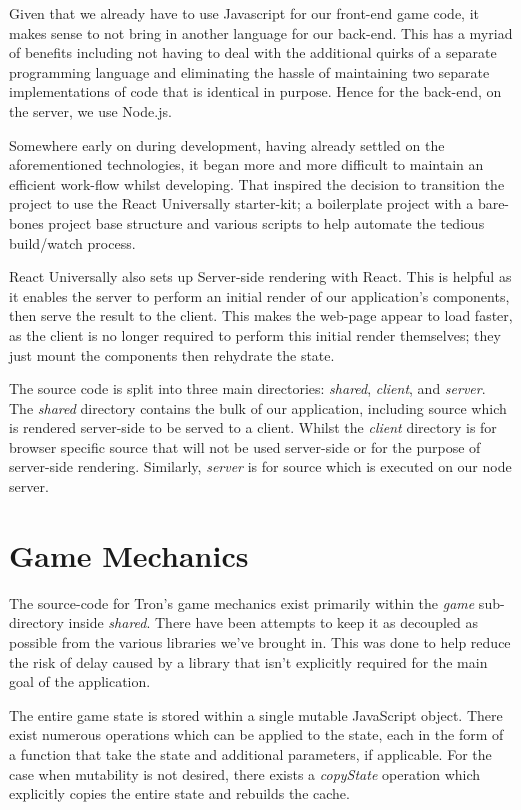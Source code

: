 \documentclass{standalone}
\begin{document}
	Given that we already have to use Javascript for our front-end game code, it makes sense to not bring in another language for our back-end. This has a myriad of benefits including not having to deal with the additional quirks of a separate programming language and eliminating the hassle of maintaining two separate implementations of code that is identical in purpose. Hence for the back-end, on the server, we use Node.js\parencite{NodeJs}.

	Somewhere early on during development, having already settled on the aforementioned technologies, it began more and more difficult to maintain an efficient work-flow whilst developing. That inspired the decision to transition the project to use the React Universally \parencite{ReactUniversally} starter-kit; a boilerplate project with a bare-bones project base structure and various scripts to help automate the tedious build/watch process.

	React Universally also sets up Server-side rendering with React. This is helpful as it enables the server to perform an initial render of our application's components, then serve the result to the client. This makes the web-page appear to load faster, as the client is no longer required to perform this initial render themselves; they just mount the components then rehydrate the state.

	The source code is split into three main directories: \emph{shared}, \emph{client}, and \emph{server}. The \emph{shared} directory contains the bulk of our application, including source which is rendered server-side to be served to a client. Whilst the \emph{client} directory is for browser specific source that will not be used server-side or for the purpose of server-side rendering. Similarly, \emph{server} is for source which is executed on our node server.

	\section{Game Mechanics}
		The source-code for Tron's game mechanics exist primarily within the \emph{game} sub-directory inside \emph{shared}. There have been attempts to keep it as decoupled as possible from the various libraries we've brought in. This was done to help reduce the risk of delay caused by a library that isn't explicitly required for the main goal of the application.

		The entire game state is stored within a single mutable JavaScript object. There exist numerous operations which can be applied to the state, each in the form of a function that take the state and additional parameters, if applicable. For the case when mutability is not desired, there exists a \emph{copyState} operation which explicitly copies the entire state and rebuilds the cache.
\end{document}
